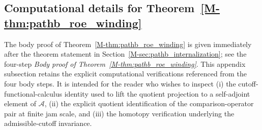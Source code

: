 \documentclass[11pt]{article}
\numberwithin{equation}{section}
\theoremstyle{definition}
\theoremstyle{remark}
\begin{document}
\subsection{Computational details for Theorem~\ref{M-thm:pathb_roe_winding}}\label{app:proof:thm:pathb_roe_winding}
The body proof of Theorem~\ref{M-thm:pathb_roe_winding} is given immediately after the theorem
statement in Section~\ref{M-sec:pathb_internalization}; see the four-step
\emph{Body proof of Theorem~\ref{M-thm:pathb_roe_winding}}. This appendix subsection retains the
explicit computational verifications referenced from the four body steps. It is intended for the
reader who wishes to inspect (i) the cutoff-functional-calculus identity used to lift the quotient
projection to a self-adjoint element of \(\mathcal A\), (ii) the explicit quotient identification of
the comparison-operator pair at finite jam scale, and (iii) the homotopy verification underlying
the admissible-cutoff invariance.
\end{document}
